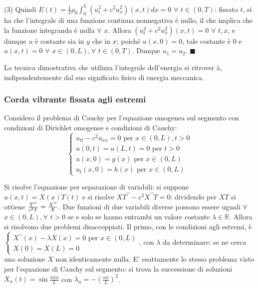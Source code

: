 \documentclass{article}
\begin{document}
(3) Quindi $E\left( t\right) =\frac{1}{2}\rho _{0}\int_{0}^{L}\left(
u_{t}^{2}+c^{2}u_{x}^{2}\right) \left( x,t\right) dx=0$ $\forall $ $t\in
\left( 0,T\right) $: fissato $t$, si ha che l'integrale di una funzione
continua nonnegativa \`{e} nullo, il che implica che la funzione integranda 
\`{e} nulla $\forall $ $x$. Allora $\left( u_{t}^{2}+c^{2}u_{x}^{2}\right)
\left( x,t\right) =0$ $\forall $ $t,x$, e dunque $u$ \`{e} costante sia in $%
y $ che in $x$; poich\'{e} $u\left( x,0\right) =0$, tale costante \`{e} $0$
e $u\left( x,t\right) =0$ $\forall $ $x\in \left( 0,L\right) ,\forall $ $%
t\in \left( 0,T\right) $. Dunque $u_{1}=u_{2}$. $\blacksquare $

La tecnica dimostrativa che utilizza l'integrale dell'energia si ritrover%
\`{a}, indipendentemente dal suo significato fisico di energia meccanica.

\subsubsection{Corda vibrante fissata agli estremi}

Considero il problema di Cauchy per l'equazione omogenea sul segmento con
condizioni di Dirichlet omogenee e condizioni di Cauchy:%
\begin{equation*}
\left\{ 
\begin{array}{c}
u_{tt}-c^{2}u_{xx}=0\text{ per }x\in \left( 0,L\right) ,t>0 \\ 
u\left( 0,t\right) =u\left( L,t\right) =0\text{ per }t>0 \\ 
u\left( x,0\right) =g\left( x\right) \text{ per }x\in \left( 0,L\right) \\ 
u_{t}\left( x,0\right) =h\left( x\right) \text{ per }x\in \left( 0,L\right)%
\end{array}%
\right.
\end{equation*}

Si risolve l'equazione per separazione di variabili: si suppone $u\left(
x,t\right) =X\left( x\right) T\left( t\right) $ e si risolve $XT^{\prime
\prime }-c^{2}X^{\prime \prime }T=0$: dividendo per $XT$ si ottiene $\frac{%
T^{\prime \prime }}{c^{2}T}=\frac{X^{\prime \prime }}{X}$. Due funzioni di
due variabili diverse possono essere uguali $\forall $ $x\in \left(
0,L\right) ,\forall $ $t>0$ se e solo se hanno entrambi un valore costante $%
\lambda \in 
\mathbb{R}
$. Allora si risolvono due problemi disaccoppiati. Il primo, con le
condizioni agli estremi, \`{e} $\left\{ 
\begin{array}{c}
X^{\prime \prime }\left( x\right) -\lambda X\left( x\right) =0\text{ per }%
x\in \left( 0,L\right) \\ 
X\left( 0\right) =X\left( L\right) =0%
\end{array}%
\right. $, con $\lambda $ da determinare: se ne cerca una soluzione $X$ non
identicamente nulla. E' esattamente lo stesso problema visto per l'equazione
di Cauchy sul segmento: si trova la successione di soluzioni $X_{n}\left(
t\right) =\sin \frac{n\pi x}{L}$ con $\lambda _{n}=-\left( \frac{n\pi }{L}%
\right) ^{2}$.
\end{document}
